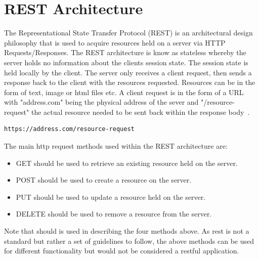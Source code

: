   
\section{REST Architecture}
The  Representational State Transfer Protocol (REST) is an architectural design philosophy that  is used to acquire resources held on a server via HTTP Requests/Responses. The REST architecture is know as stateless whereby the server holds no information about the clients session state. The session state is held locally by the client. The server only receives a client request, then sends a response back to the client with the resources requested. Resources can be in the form of text, image or html files etc. A client request is in the form of a URL with "address.com" being the physical address of the sever and "/resource-request" the actual resource needed to be sent back within the response body~\cite{Understa52:online}. 
\begin{verbatim}
https://address.com/resource-request
\end{verbatim} 
The main http request methods used within the REST architecture are:
\begin{itemize}
	\item GET should be used to retrieve an existing resource held on the server.
	\item POST should be used to create a resource on the server.
	\item PUT should be used to update a resource held on the server.
	\item DELETE should be used to remove a resource from the server.
\end{itemize}
Note that should is used in describing the four methods above.
As rest is not a standard but rather a set of guidelines to follow, the above methods can be used for different functionality but would not be considered a restful application.
